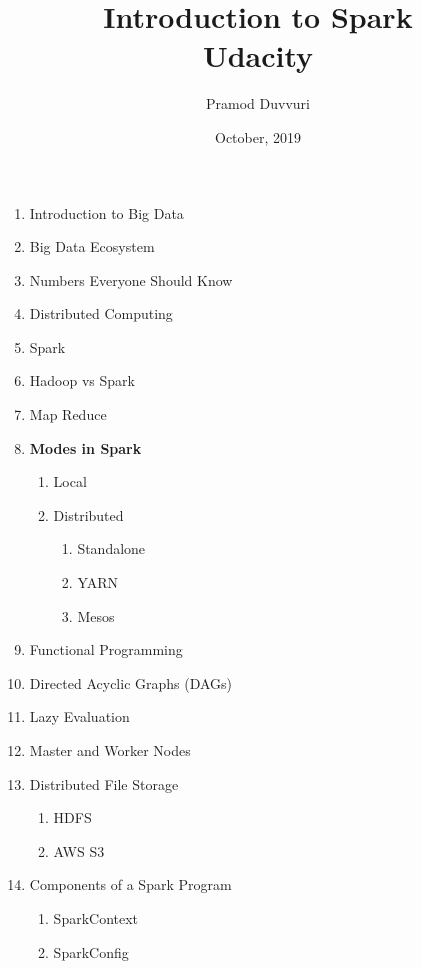 \documentclass[11pt]{article}
\title{Introduction to Spark \\ 
	\normalsize Udacity
  }
\author{Pramod Duvvuri}
\date{October, 2019}
\begin{document}
	\maketitle
\begin{enumerate}
   \item Introduction to Big Data
   \item Big Data Ecosystem
   \item Numbers Everyone Should Know
   \item Distributed Computing
   \item Spark
   \item Hadoop vs Spark
   \item Map Reduce
   \item \textbf{Modes in Spark}
   \begin{enumerate}
   	\item Local
   	\item Distributed
   	\begin{enumerate}
   		\item Standalone
   		\item YARN
   		\item Mesos
   	\end{enumerate}
   \end{enumerate}
    \item Functional Programming
    \item Directed Acyclic Graphs (DAGs)
    \item Lazy Evaluation
    \item Master and Worker Nodes
    \item Distributed File Storage
    \begin{enumerate}
    	\item HDFS
    	\item AWS S3
    \end{enumerate}
    \item Components of a Spark Program
    \begin{enumerate}
    	\item SparkContext
    	\item SparkConfig
    \end{enumerate}
\end{enumerate}
\end{document}
